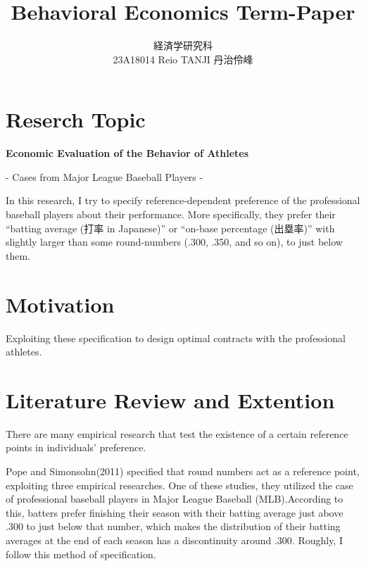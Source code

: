 \documentclass{jsarticle}[12pt]
\begin{document}
\title{Behavioral Economics Term-Paper}
\author{経済学研究科　 \\ 23A18014 Reio TANJI 丹治伶峰}
\date{}
\maketitle

\section{Reserch Topic}

\Large

\textbf{Economic Evaluation of the Behavior of Athletes}

\hspace{5zw}- Cases from Major League Baseball Players -

\large

\vspace{1zw}

In this research, I try to specify reference-dependent preference of the professional baseball players about their performance. More specifically, they prefer their ``batting average (打率 in Japanese)'' or ``on-base percentage (出塁率)'' with slightly larger than some round-numbers (.300, .350, and so on), to just below them.

\section{Motivation}

Exploiting these specification to design optimal contracts with the professional athletes.

\section{Literature Review and Extention}

There are many empirical research that test the existence of a certain reference points in individuals' preference.

Pope and Simonsohn(2011) specified that round numbers act as a reference point, exploiting three empirical researches. One of these studies, they utilized the case of professional baseball players in Major League Baseball (MLB).According to this, batters prefer finishing their season with their batting average just above .300 to just below that number, which makes the distribution of their batting averages at the end of each season has a discontinuity around .300. Roughly, I follow this method of specification.
\end{document}
